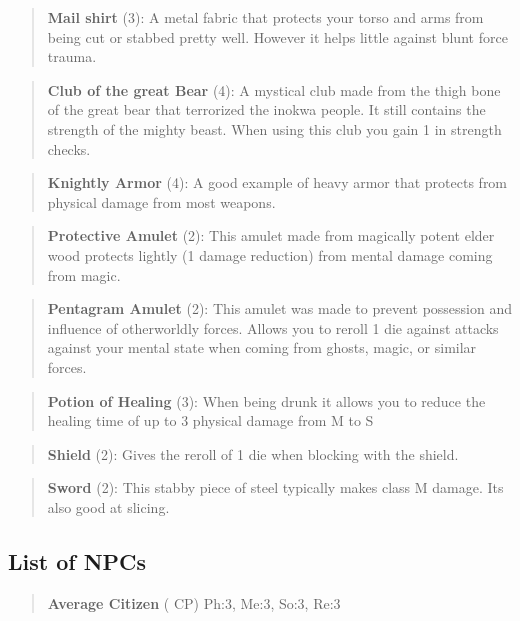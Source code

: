 \documentclass[11pt]{article}
\begin{document}
{\begin{quote}
\textbf{Mail shirt} (3): A metal fabric that protects your torso and arms from being cut or stabbed pretty well. However it helps little against blunt force trauma.
\end{quote}

\begin{quote}
\textbf{Club of the great Bear} (4): A mystical club made from the thigh bone of the great bear that terrorized the inokwa people. It still contains the strength of the mighty beast. When using this club you gain 1 in strength checks.
\end{quote}

\begin{quote}
\textbf{Knightly Armor} (4): A good example of heavy armor that protects from physical damage from most weapons.
\end{quote}

\begin{quote}
\textbf{Protective Amulet} (2): This amulet made from magically potent elder wood protects lightly (1 damage reduction) from mental damage coming from magic.
\end{quote}

\begin{quote}
\textbf{Pentagram Amulet} (2): This amulet was made to prevent possession and influence of otherworldly forces. Allows you to reroll 1 die against attacks against your mental state when coming from ghosts, magic, or similar forces.
\end{quote}

\begin{quote}
\textbf{Potion of Healing} (3): When being drunk it allows you to reduce the healing time of up to 3 physical damage from M to S
\end{quote}

\begin{quote}
\textbf{Shield} (2): Gives the reroll of 1 die when blocking with the shield.
\end{quote}

\begin{quote}
\textbf{Sword} (2): This stabby piece of steel typically makes class M damage. Its also good at slicing.
\end{quote}


\subsection{List of NPCs}
\label{sec:orgad6a9a8}
\begin{quote}
\textbf{Average Citizen} ( CP)
Ph:3, Me:3, So:3, Re:3
\end{quote}

}
\end{document}
